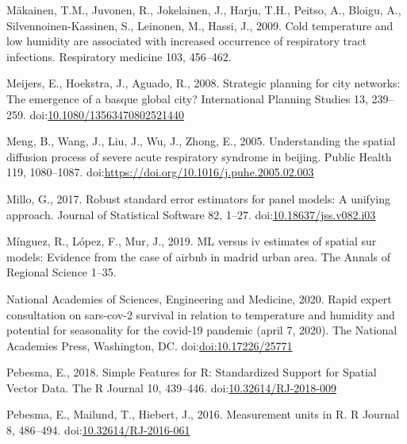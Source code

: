 \documentclass[]{elsarticle} %
\begin{document}
\leavevmode\hypertarget{ref-Makinen2009cold}{}%
Mäkainen, T.M., Juvonen, R., Jokelainen, J., Harju, T.H., Peitso, A.,
Bloigu, A., Silvennoinen-Kassinen, S., Leinonen, M., Hassi, J., 2009.
Cold temperature and low humidity are associated with increased
occurrence of respiratory tract infections. Respiratory medicine 103,
456--462.

\leavevmode\hypertarget{ref-Meijers2008strategic}{}%
Meijers, E., Hoekstra, J., Aguado, R., 2008. Strategic planning for city
networks: The emergence of a basque global city? International Planning
Studies 13, 239--259.
doi:\href{https://doi.org/10.1080/13563470802521440}{10.1080/13563470802521440}

\leavevmode\hypertarget{ref-Meng2005understanding}{}%
Meng, B., Wang, J., Liu, J., Wu, J., Zhong, E., 2005. Understanding the
spatial diffusion process of severe acute respiratory syndrome in
beijing. Public Health 119, 1080--1087.
doi:\href{https://doi.org/https://doi.org/10.1016/j.puhe.2005.02.003}{https://doi.org/10.1016/j.puhe.2005.02.003}

\leavevmode\hypertarget{ref-Millo2017robust}{}%
Millo, G., 2017. Robust standard error estimators for panel models: A
unifying approach. Journal of Statistical Software 82, 1--27.
doi:\href{https://doi.org/10.18637/jss.v082.i03}{10.18637/jss.v082.i03}

\leavevmode\hypertarget{ref-Minguez2019}{}%
Mínguez, R., López, F., Mur, J., 2019. ML versus iv estimates of spatial
sur models: Evidence from the case of airbnb in madrid urban area. The
Annals of Regional Science 1--35.

\leavevmode\hypertarget{ref-National2020rapid}{}%
National Academies of Sciences, Engineering and Medicine, 2020. Rapid
expert consultation on sars-cov-2 survival in relation to temperature
and humidity and potential for seasonality for the covid-19 pandemic
(april 7, 2020). The National Academies Press, Washington, DC.
doi:\href{https://doi.org/doi:10.17226/25771}{doi:10.17226/25771}

\leavevmode\hypertarget{ref-Pebesma2018}{}%
Pebesma, E., 2018. Simple Features for R: Standardized Support for
Spatial Vector Data. The R Journal 10, 439--446.
doi:\href{https://doi.org/10.32614/RJ-2018-009}{10.32614/RJ-2018-009}

\leavevmode\hypertarget{ref-Pebesma2016}{}%
Pebesma, E., Mailund, T., Hiebert, J., 2016. Measurement units in R. R
Journal 8, 486--494.
doi:\href{https://doi.org/10.32614/RJ-2016-061}{10.32614/RJ-2016-061}
\end{document}
